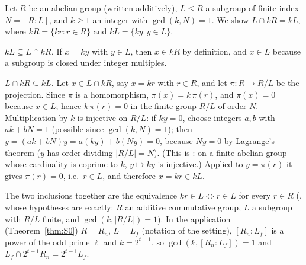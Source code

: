Let $R$ be an abelian group (written additively), $L\le R$ a subgroup of finite index $N=[R:L]$, and $k\ge1$ an integer with $\gcd(k,N)=1$. We show $L\cap kR=kL$, where $kR=\{kr:r\in R\}$ and $kL=\{ky:y\in L\}$.

\emph{$kL\subseteq L\cap kR$.} If $x=ky$ with $y\in L$, then $x\in kR$ by definition, and $x\in L$ because a subgroup is closed under integer multiples.

\emph{$L\cap kR\subseteq kL$.} Let $x\in L\cap kR$, say $x=kr$ with $r\in R$, and let $\pi:R\to R/L$ be the projection. Since $\pi$ is a homomorphism, $\pi(x)=k\,\pi(r)$, and $\pi(x)=0$ because $x\in L$; hence $k\,\pi(r)=0$ in the finite group $R/L$ of order $N$. Multiplication by $k$ is injective on $R/L$: if $k\bar y=0$, choose integers $a,b$ with $ak+bN=1$ (possible since $\gcd(k,N)=1$); then $\bar y=(ak+bN)\bar y=a(k\bar y)+b(N\bar y)=0$, because $N\bar y=0$ by Lagrange's theorem ($\bar y$ has order dividing $|R/L|=N$). (This is : on a finite abelian group whose cardinality is coprime to $k$, $y\mapsto ky$ is injective.) Applied to $\bar y=\pi(r)$ it gives $\pi(r)=0$, i.e.\ $r\in L$, and therefore $x=kr\in kL$.

The two inclusions together are the equivalence $kr\in L\iff r\in L$ for every $r\in R$ (, whose hypotheses are exactly: $R$ an additive commutative group, $L$ a subgroup with $R/L$ finite, and $\gcd(k,|R/L|)=1$). In the application (Theorem~\ref{thm:S0}) $R=R_n$, $L=L_f$ (notation of the setting), $[R_n:L_f]$ is a power of the odd prime $\ell$ and $k=2^{t-1}$, so $\gcd(k,[R_n:L_f])=1$ and $L_f\cap2^{t-1}R_n=2^{t-1}L_f$.
